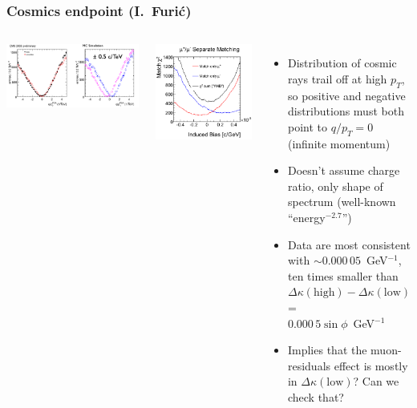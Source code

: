 \documentclass[compress]{beamer}
\begin{document}
\begin{frame}
\frametitle{Cosmics endpoint {\normalsize (I.~Furi\'c)}}

\begin{columns}
\includegraphics[width=\linewidth]{ivan_cosmic_endpoint.png}

\includegraphics[width=0.7\linewidth]{ivan_chi2.png}
\begin{itemize}
\item Distribution of cosmic rays trail off at high $p_T$, so positive
  and negative distributions must both point to $q/p_T = 0$ (infinite momentum)

\item Doesn't assume charge ratio, only shape of spectrum (well-known ``energy$^{-2.7}$'')

\item Data are most consistent with $\sim 0.000\,05$~GeV$^{-1}$, ten times
  smaller than $\Delta \kappa(\mbox{high}) - \Delta \kappa(\mbox{low})$ = \\ \hfill $0.000\,5 \sin\phi$~GeV$^{-1}$

\item Implies that the muon-residuals effect is mostly in $\Delta \kappa(\mbox{low})$?  Can we check that?

\end{itemize}
\end{columns}
\end{frame}
\end{document}
